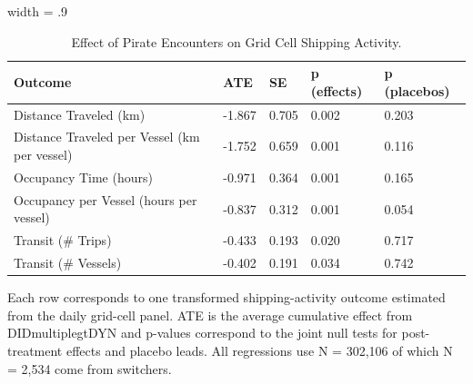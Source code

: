 \begin{table}
\centering
\caption{Effect of Pirate Encounters on Grid Cell Shipping Activity. \label{tab:grid-level-did-multiplegt-dyn-summary}}
\centering
\begin{adjustbox}{width = .9\textwidth}
\begin{threeparttable}
\begin{tabular}[t]{lllll}
\toprule
Outcome & ATE & SE & p (effects) & p (placebos)\\
\midrule
Distance Traveled (km) & -1.867 & 0.705 & 0.002 & 0.203\\
Distance Traveled per Vessel (km per vessel) & -1.752 & 0.659 & 0.001 & 0.116\\
Occupancy Time (hours) & -0.971 & 0.364 & 0.001 & 0.165\\
Occupancy per Vessel (hours per vessel) & -0.837 & 0.312 & 0.001 & 0.054\\
Transit (\# Trips) & -0.433 & 0.193 & 0.020 & 0.717\\
Transit (\# Vessels) & -0.402 & 0.191 & 0.034 & 0.742\\
\bottomrule
\end{tabular}
\begin{tablenotes}
\item \scriptsize Each row corresponds to one transformed shipping-activity outcome estimated from the daily grid-cell panel. ATE is the average cumulative effect from DIDmultiplegtDYN and p-values correspond to the joint null tests for post-treatment effects and placebo leads. All regressions use N = 302,106 of which N = 2,534 come from switchers.
\end{tablenotes}
\end{threeparttable}
\end{adjustbox}
\end{table}

